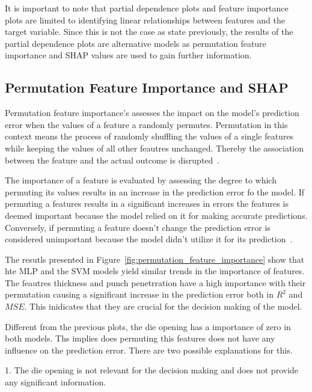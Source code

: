 It is important to note that partial dependence plots and feature importance plots are limited to
identifying linear relationships between features and the target variable.
Since this is not the case as state previously, the results of the partial dependence plots are
alternative models as permutation feature importance and SHAP values are used to gain further
information.

\subsection{Permutation Feature Importance and SHAP}\label{subsec:permutation-feature-importance-
and-shap}

Permutation feature importance's assesses the impact on the model's prediction error when the values
of a feature a randomly permutes.
Permutation in this context means the process of randomly shuffling the values of a single features while keeping the
values of all other feautres unchanged.
Thereby the association between the feature and the actual outcome is disrupted~\cite[p. 157]{molnar2020interpretable}.

The importance of a feature is evaluated by assessing the degree to which permuting its values
results in an increase in the prediction error fo the model.
If permuting a features results in a significant increases in errors the features is deemed
important because the model relied on it for making accurate predictions.
Conversely, if permuting a feature doesn't change the prediction error is considered unimportant
because the model didn't utilize it for its prediction~\cite[p. 158]{molnar2020interpretable}.

The resutls presented in Figure~\ref{fig:permutation_feature_importance} show that hte MLP and the SVM models yield
similar trends in the importance of features.
The feautres thickness and punch penetrration have a high importance with their permutation causing a significant
increase
in the prediction error both in $R^2$ and $MSE$.
This inidicates that they are crucial for the decision making of the model.

Different from the previous plots, the die opening has a importance of zero in both models.
Ths implies does permuting this features does not have any influence on the prediction error.
There are two possible explanations for this.

1. The die opening is not relevant for the decision making and does not provide any significant information.

